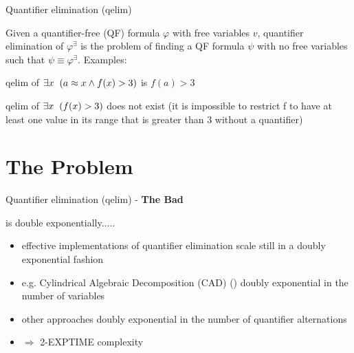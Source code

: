 \documentclass{beamer}
\begin{document}
\begin{frame}{Quantifier elimination (qelim)}

Given a quantifier-free (QF) formula $\varphi$ with free variables $v$, quantifier elimination of $\varphi^{\exists}$ is the problem of finding a QF formula $\psi$ with no free variables such that $\psi \equiv \varphi^{\exists}$.
\pause
\vspace{0.5cm}
Examples:

\vspace{0.1cm}

qelim of $\exists x \hspace{2mm} (a \approx x \land f(x) > 3)$ is $f(a) > 3$ 
\pause
\vspace{0.1cm}

qelim of $\exists x \hspace{2mm} (f(x) > 3)$ does not exist 
(it is impossible to restrict f to have at least one value in its range that is greater than 3 without a quantifier)

\end{frame}



\section{The Problem}


\begin{frame}{Quantifier elimination (qelim) - \textbf{The Bad}}

\begin{block}{is double exponentially.....}
\begin{itemize}
  \item effective implementations of quantifier elimination scale still in a doubly exponential fashion
  \item e.g. Cylindrical Algebraic Decomposition (CAD) (\cite{10.1145/1093390.1093393}) doubly exponential in the number of variables
  \pause
  \item other approaches doubly exponential in the number of quantifier alternations
  \pause
  \item $\Longrightarrow$ 2-EXPTIME complexity
\end{itemize}
\end{block}
\end{frame}
\end{document}
